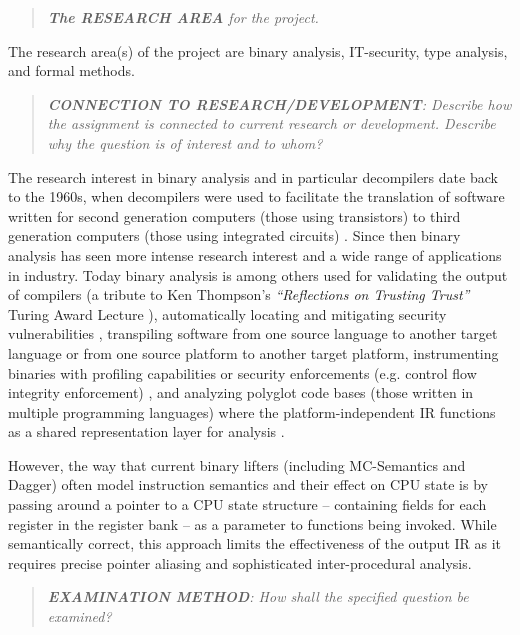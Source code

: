 \documentclass[12pt, a4paper]{article}
\begin{document}
\begin{quote}
	\textit{\textbf{The RESEARCH AREA} for the project.}
\end{quote}

The research area(s) of the project are binary analysis, IT-security, type analysis, and formal methods.

\begin{quote}
	\textit{\textbf{CONNECTION TO RESEARCH/DEVELOPMENT}: Describe how the assignment is connected to current research or development. Describe why the question is of interest and to whom?}
\end{quote}

The research interest in binary analysis and in particular decompilers date back to the 1960s, when decompilers were used to facilitate the translation of software written for second generation computers (those using transistors) to third generation computers (those using integrated circuits) \cite{reverse_compilation}. Since then binary analysis has seen more intense research interest and a wide range of applications in industry. Today binary analysis is among others used for validating the output of compilers (a tribute to Ken Thompson's \textit{``Reflections on Trusting Trust''} Turing Award Lecture \cite{trusting_trust}), automatically locating and mitigating security vulnerabilities \cite{state_of_the_art_of_war}, transpiling software from one source language to another target language or from one source platform to another target platform, instrumenting binaries with profiling capabilities or security enforcements (e.g. control flow integrity enforcement) \cite{superset_disassembly}, and analyzing polyglot code bases (those written in multiple programming languages) where the platform-independent IR functions as a shared representation layer for analysis \cite{revgen}.

However, the way that current binary lifters (including MC-Semantics and Dagger) often model instruction semantics and their effect on CPU state is by passing around a pointer to a CPU state structure -- containing fields for each register in the register bank -- as a parameter to functions being invoked. While semantically correct, this approach limits the effectiveness of the output IR as it requires precise pointer aliasing and sophisticated inter-procedural analysis.


\begin{quote}
	\textit{\textbf{EXAMINATION METHOD}: How shall the specified question be examined?}
\end{quote}
\end{document}
